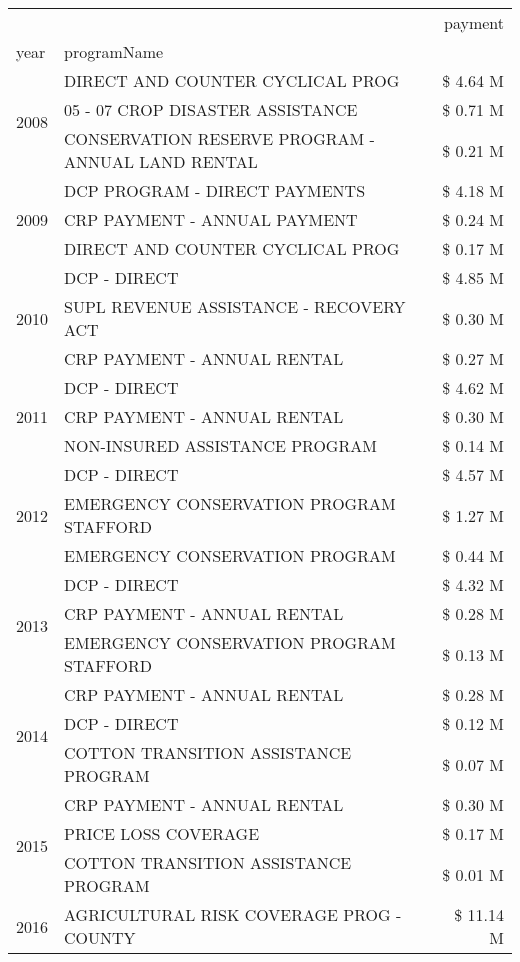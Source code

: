 \begin{tabular}{llr}
\toprule
 &  & payment \\
year & programName &  \\
\midrule
\multirow[t]{3}{*}{2008} & DIRECT AND COUNTER CYCLICAL PROG & \$ 4.64 M \\
 & 05 - 07 CROP DISASTER ASSISTANCE & \$ 0.71 M \\
 & CONSERVATION RESERVE PROGRAM - ANNUAL LAND RENTAL & \$ 0.21 M \\
\cline{1-3}
\multirow[t]{3}{*}{2009} & DCP PROGRAM - DIRECT PAYMENTS & \$ 4.18 M \\
 & CRP PAYMENT - ANNUAL PAYMENT & \$ 0.24 M \\
 & DIRECT AND COUNTER CYCLICAL PROG & \$ 0.17 M \\
\cline{1-3}
\multirow[t]{3}{*}{2010} & DCP - DIRECT & \$ 4.85 M \\
 & SUPL REVENUE ASSISTANCE - RECOVERY ACT & \$ 0.30 M \\
 & CRP PAYMENT - ANNUAL RENTAL & \$ 0.27 M \\
\cline{1-3}
\multirow[t]{3}{*}{2011} & DCP - DIRECT & \$ 4.62 M \\
 & CRP PAYMENT - ANNUAL RENTAL & \$ 0.30 M \\
 & NON-INSURED ASSISTANCE PROGRAM & \$ 0.14 M \\
\cline{1-3}
\multirow[t]{3}{*}{2012} & DCP - DIRECT & \$ 4.57 M \\
 & EMERGENCY CONSERVATION PROGRAM STAFFORD & \$ 1.27 M \\
 & EMERGENCY CONSERVATION PROGRAM & \$ 0.44 M \\
\cline{1-3}
\multirow[t]{3}{*}{2013} & DCP - DIRECT & \$ 4.32 M \\
 & CRP PAYMENT - ANNUAL RENTAL & \$ 0.28 M \\
 & EMERGENCY CONSERVATION PROGRAM STAFFORD & \$ 0.13 M \\
\cline{1-3}
\multirow[t]{3}{*}{2014} & CRP PAYMENT - ANNUAL RENTAL & \$ 0.28 M \\
 & DCP - DIRECT & \$ 0.12 M \\
 & COTTON TRANSITION ASSISTANCE PROGRAM & \$ 0.07 M \\
\cline{1-3}
\multirow[t]{3}{*}{2015} & CRP PAYMENT - ANNUAL RENTAL & \$ 0.30 M \\
 & PRICE LOSS COVERAGE & \$ 0.17 M \\
 & COTTON TRANSITION ASSISTANCE PROGRAM & \$ 0.01 M \\
\cline{1-3}
\multirow[t]{3}{*}{2016} & AGRICULTURAL RISK COVERAGE PROG - COUNTY & \$ 11.14 M \\

\end{tabular}
